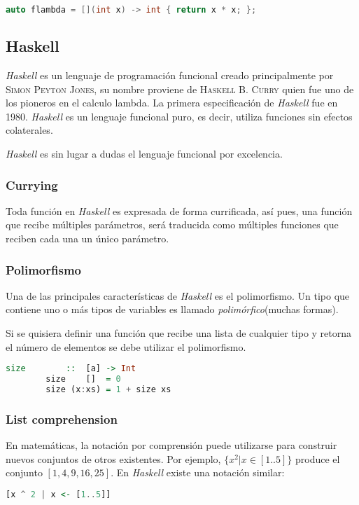 		\begin{lstlisting}[language=C++, caption=Auto type en C++]
		auto flambda = [](int x) -> int { return x * x; };
		\end{lstlisting}
				
	\subsection{Haskell}
		\emph{Haskell} es un lenguaje de programación funcional creado principalmente por \textsc{Simon Peyton Jones}, su nombre proviene de \textsc{Haskell B. Curry} quien fue uno de los pioneros en el calculo lambda. La primera especificación de \emph{Haskell} fue en 1980. \emph{Haskell} es un lenguaje funcional puro, es decir, utiliza funciones sin efectos colaterales. \cite{Thompson2011}
		
		\emph{Haskell} es sin lugar a dudas el lenguaje funcional por excelencia.
		
		\subsubsection{Currying}
		Toda función en \emph{Haskell} es expresada de forma currificada, así pues, una función que recibe múltiples parámetros, será traducida como múltiples funciones que reciben cada una un único parámetro.
		
		\subsubsection{Polimorfismo}
		Una de las principales características de \emph{Haskell} es el polimorfismo. Un tipo que contiene uno o más tipos de variables es llamado \emph{polimórfico}(muchas formas).\cite{Hutton2007}
		
		Si se quisiera definir una función que recibe una lista de cualquier tipo y retorna el número de elementos se debe utilizar el polimorfismo.
		
		\begin{lstlisting}[language=Haskell, caption=Polimorfismo]
		size		::	[a] -> Int
		size 	[]	= 0
		size (x:xs) = 1 + size xs
		\end{lstlisting}
		
		\subsubsection{List comprehension}
		En matemáticas, la notación por comprensión puede utilizarse para construir nuevos conjuntos de otros existentes. Por ejemplo, $\{x^2 | x \in [1..5]\}$ produce el conjunto $[1,4,9,16,25]$. En \emph{Haskell} existe una notación similar: \cite{Hutton2007}
		\begin{lstlisting}[language=Haskell, caption=List comprehension]
		[x ^ 2 | x <- [1..5]]
		\end{lstlisting}



